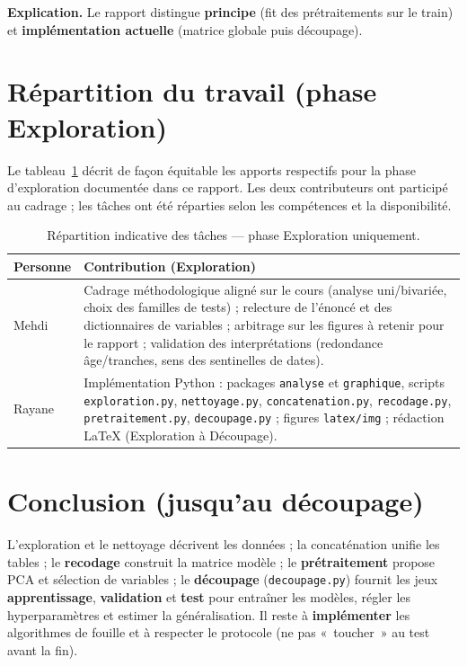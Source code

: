 \documentclass[11pt,a4paper]{article}
\begin{document}
\textbf{Explication.} Le rapport distingue \textbf{principe} (fit des prétraitements sur le train) et \textbf{implémentation actuelle} (matrice globale puis découpage).

\section{Répartition du travail (phase Exploration)}

Le tableau~\ref{tab:contrib} décrit de façon équitable les apports respectifs pour la phase d'exploration documentée dans ce rapport. Les deux contributeurs ont participé au cadrage ; les tâches ont été réparties selon les compétences et la disponibilité.

\begin{table}[htbp]
  \centering
  \begin{tabular}{@{}p{}p{}@{}}
    \toprule
    \textbf{Personne} & \textbf{Contribution (Exploration)} \\
    \midrule
    Mehdi &
    Cadrage méthodologique aligné sur le cours (analyse uni/bivariée, choix des familles de tests) ; relecture de l'énoncé et des dictionnaires de variables ; arbitrage sur les figures à retenir pour le rapport ; validation des interprétations (redondance âge/tranches, sens des sentinelles de dates). \\
    \addlinespace
    Rayane &
    Implémentation Python : packages \texttt{analyse} et \texttt{graphique}, scripts \texttt{exploration.py}, \texttt{nettoyage.py}, \texttt{concatenation.py}, \texttt{recodage.py}, \texttt{pretraitement.py}, \texttt{decoupage.py} ; figures \texttt{latex/img} ; rédaction \LaTeX{} (Exploration à Découpage). \\
    \bottomrule
  \end{tabular}
  \caption{Répartition indicative des tâches --- phase Exploration uniquement.}
  \label{tab:contrib}
\end{table}

\section*{Conclusion (jusqu'au découpage)}

L'exploration et le nettoyage décrivent les données ; la concaténation unifie les tables ; le \textbf{recodage} construit la matrice modèle ; le \textbf{prétraitement} propose PCA et sélection de variables ; le \textbf{découpage} (\texttt{decoupage.py}) fournit les jeux \textbf{apprentissage}, \textbf{validation} et \textbf{test} pour entraîner les modèles, régler les hyperparamètres et estimer la généralisation. Il reste à \textbf{implémenter} les algorithmes de fouille et à respecter le protocole (ne pas «~toucher~» au test avant la fin).
\end{document}
